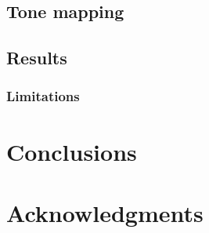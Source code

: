 \documentclass{sig-alternate}
\begin{document}
\subsection{Tone mapping}


\subsection{Results}


\subsubsection{Limitations}

\section{Conclusions}



\section*{Acknowledgments}
\label{sec:acknowledgments}



  
\end{document}
